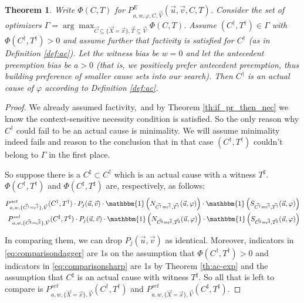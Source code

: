 \documentclass{article}
\newtheorem{theorem}{Theorem}
\begin{document}
\begin{theorem} \label{th:local_max_to_ac} Write $\Phi (C, T)$ for $P^{E}_{a, w, \varphi, C, \vec{V}}(\vec{u}, \vec{v}, C, T)$. Consider the set of optimizers  $\Gamma = \arg\max_{\vec{C} \subseteq \{\vec{X} = \vec{x}\}, \vec{T} \subseteq \vec{V}} \Phi(C, T)$.  Assume $(C^\dagger, T^\dagger)\in \Gamma$ with $\Phi(C^\dagger, T^\dagger)>0$ and assume further that factivity is satisfied for $C^\dagger$ (as in Definition \ref{def:ac}). Let the witness bias be $w=0$ and let the antecedent preemption bias be $a>0$ (that is, we positively prefer antecedent preemption, thus building preference of smaller cause sets into our search). Then $C^\dagger$ is an actual cause of $\varphi$ according to Definition \ref{def:ac}.
\end{theorem}

\begin{proof}
We already assumed factivity, and by Theorem \ref{th:if_pr_then_nec} we know the context-sensitive necessity condition is satisfied. So the only reason why $C^\dagger$ could fail to be an actual cause is minimality. We will assume minimality indeed fails and reason to the conclusion that in that case $(C^\dagger, T^\dagger)$ couldn't belong to $\Gamma$ in the first place.


So suppose there is a $C^\sharp \subset C^\dagger$ which is an actual cause with a witness $T^\sharp$. $\Phi(C^\dagger, T^\dagger)$ and $\Phi(C^\sharp, T^\sharp)$ are, respectively, as follows:
\begin{align}
P^{\mathit{set}}_{a,w, \{\vec{C^\dagger}=\vec {c^\dagger}\}, \vec{V}}(C^\dagger,T^\dagger) \cdot P_j(\vec{u}, \vec{v}) \cdot \mathbbm{1}\left(N_{\vec{C^\dagger} = \vec{c^\dagger}, \vec{T^\dagger}}(\vec{u}, \varphi)\right) \cdot \mathbbm{1}\left(S_{\vec{C^\dagger} = \vec{c^\dagger}, \vec{T^\dagger}}(\vec{u}, \varphi)\right)  \label{eq:comparisondagger}\\
P^{\mathit{set}}_{a,w, \{\vec{C^\sharp}=\vec {c^\sharp}\}, \vec{V}}(C^\sharp,T^\sharp) \cdot P_j(\vec{u}, \vec{v}) \cdot \mathbbm{1}\left(N_{\vec{C^\sharp} = \vec{c^\sharp}, \vec{T^\sharp}}(\vec{u}, \varphi)\right) \cdot \mathbbm{1}\left(S_{\vec{C^\sharp} = \vec{c^\sharp}, \vec{T^\sharp}}(\vec{u}, \varphi)\right) \label{eq:comparisonsharp}
\end{align}

\noindent In comparing them, we can drop  $P_j(\vec{u}, \vec{v})$ as identical. Moreover, indicators in \eqref{eq:comparisondagger} are 1s on the assumption that $\Phi(C^\dagger, T^\dagger)>0$ and indicators in \eqref{eq:comparisonsharp} are 1s by Theorem \ref{th:ac-exp} and the assumption that $C^\sharp$ is an actual cause with witness $T^\sharp$.  So all that is left to compare is $P^{\mathit{set}}_{a,w, \{\vec{X}=\vec {x}\}, \vec{V}}(C^\dagger,T^\dagger)$ and  $P^{\mathit{set}}_{a,w, \{\vec{X}=\vec {x}\}, \vec{V}}(C^\sharp,T^\sharp)$.


\end{proof}
\end{document}
